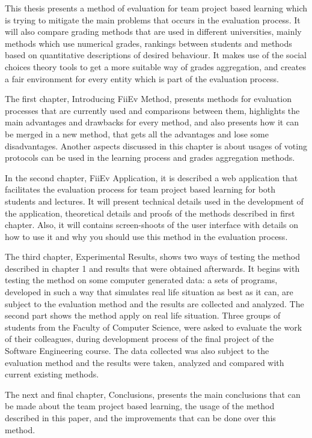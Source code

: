 This thesis presents a method of evaluation for team project based learning which is trying to mitigate the main problems that occurs in the evaluation process. It will also compare grading methods that are used in different universities, mainly methods which use numerical grades, rankings between students and methods based on quantitative descriptions of desired behaviour. It makes use of the social choices theory tools to get a more suitable way of grades aggregation, and creates a fair environment for every entity which is part of the evaluation process. 

The first chapter, Introducing FiiEv Method, presents methods for evaluation processes that are currently used and comparisons between them, highlights the main advantages and drawbacks for every method, and also presents how it can be merged in a new method, that gets all the advantages and lose some disadvantages. Another aspects discussed in this chapter is about usages of voting protocols can be used in the learning process and grades aggregation methods.

In the second chapter, FiiEv Application, it is described a web application that facilitates the evaluation process for team project based learning for both students and lectures. It will present technical details used in the development of the application, theoretical details and proofs of the methods described in first chapter. Also, it will contains screen-shoots of the user interface with details on how to use it and why you should use this method in the evaluation process.

The third chapter, Experimental Results, shows two ways of testing the method described in chapter 1 and results that were obtained afterwards. It begins with testing the method on some computer generated data: a sets of programs, developed in such a way that simulates real life situation as best as it can, are subject to the evaluation method and the results are collected and analyzed. The second part shows the method apply on real life situation. Three groups of students from the Faculty of Computer Science, were asked to evaluate the work of their colleagues, during development process of the final project of the Software Engineering course. The data collected was also subject to the evaluation method and the results were taken, analyzed and compared with current existing methods.

The next and final chapter, Conclusions, presents the main conclusions that can be made about the team project based learning, the usage of the method described in this paper, and the improvements that can be done over this method.